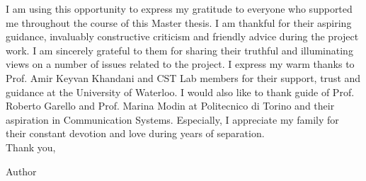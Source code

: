 \documentclass[12pt,twoside,cucitura]{toptesi}
\begin{document}
\ringraziamenti
I am using this opportunity to express my gratitude to everyone who supported me throughout the course of this Master thesis. I am thankful for their aspiring guidance, invaluably constructive criticism and friendly advice during the project work. I am sincerely grateful to them for sharing their truthful and illuminating views on a number of issues related to the project.
I express my warm thanks to Prof. Amir Keyvan Khandani and CST Lab members for their support, trust and guidance at the University of Waterloo.
I would also like to thank guide of Prof. Roberto Garello and Prof. Marina Modin at Politecnico di Torino and their aspiration in Communication Systems.
Especially, I appreciate my family for their constant devotion and love during years of separation.\\

Thank you,

Author

\figurespagetrue %

\indici
%
%
%
%
%
\mainmatter








\cleardoublepage


	



\end{document}
